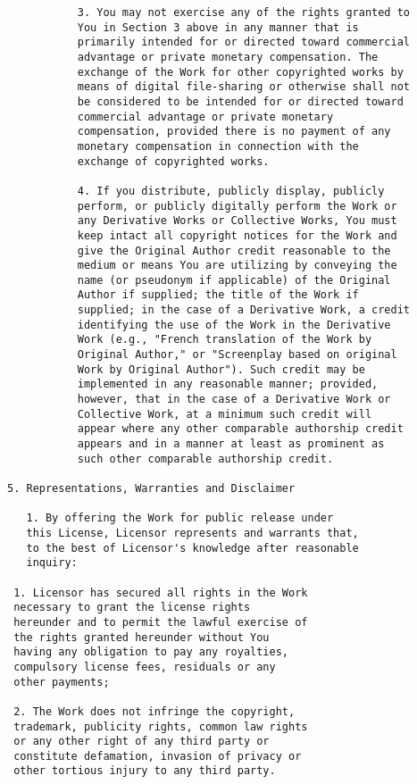 \begin{verbatim}
           3. You may not exercise any of the rights granted to
           You in Section 3 above in any manner that is
           primarily intended for or directed toward commercial
           advantage or private monetary compensation. The
           exchange of the Work for other copyrighted works by
           means of digital file-sharing or otherwise shall not
           be considered to be intended for or directed toward
           commercial advantage or private monetary
           compensation, provided there is no payment of any
           monetary compensation in connection with the
           exchange of copyrighted works.
        
           4. If you distribute, publicly display, publicly
           perform, or publicly digitally perform the Work or
           any Derivative Works or Collective Works, You must
           keep intact all copyright notices for the Work and
           give the Original Author credit reasonable to the
           medium or means You are utilizing by conveying the
           name (or pseudonym if applicable) of the Original
           Author if supplied; the title of the Work if
           supplied; in the case of a Derivative Work, a credit
           identifying the use of the Work in the Derivative
           Work (e.g., "French translation of the Work by
           Original Author," or "Screenplay based on original
           Work by Original Author"). Such credit may be
           implemented in any reasonable manner; provided,
           however, that in the case of a Derivative Work or
           Collective Work, at a minimum such credit will
           appear where any other comparable authorship credit
           appears and in a manner at least as prominent as
           such other comparable authorship credit.

5. Representations, Warranties and Disclaimer

   1. By offering the Work for public release under
   this License, Licensor represents and warrants that,
   to the best of Licensor's knowledge after reasonable
   inquiry:

 1. Licensor has secured all rights in the Work
 necessary to grant the license rights
 hereunder and to permit the lawful exercise of
 the rights granted hereunder without You
 having any obligation to pay any royalties,
 compulsory license fees, residuals or any
 other payments;

 2. The Work does not infringe the copyright,
 trademark, publicity rights, common law rights
 or any other right of any third party or
 constitute defamation, invasion of privacy or
 other tortious injury to any third party.


\end{verbatim}
